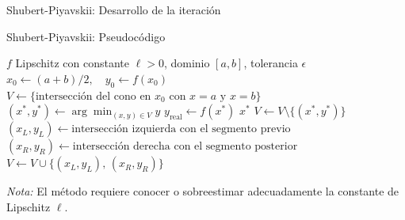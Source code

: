 \begin{frame}{Shubert-Piyavskii: Desarrollo de la iteración}
\begin{center}
\end{center}
\end{frame}

\begin{frame}{Shubert-Piyavskii: Pseudocódigo}
    \scriptsize
    \begin{algorithmic}[1]
        \Require \(f\) Lipschitz con constante \(\ell > 0\), dominio \([a,b]\), tolerancia \(\epsilon\)
        \State \(x_0 \gets (a+b)/2, \quad y_0 \gets f(x_0)\)
        \State \(V \gets \{\text{intersección del cono en } x_0 \text{ con } x=a \text{ y } x=b\}\) 
            \State \((x^*, y^*) \gets \arg\min_{(x,y) \in V} y\) 
            \State \(y_{\text{real}} \gets f(x^*)\)
             
                \State \Return \(x^*\)
            \EndIf
            \State \(V \gets V \setminus \{(x^*, y^*)\}\) 
            \State \((x_L, y_L) \gets \text{intersección izquierda con el segmento previo}\)
            \State \((x_R, y_R) \gets \text{intersección derecha con el segmento posterior}\)
            \State \(V \gets V \cup \{(x_L, y_L), \, (x_R, y_R)\}\)
        \EndWhile
    \end{algorithmic}
    \vspace{0.4em}
    {\tiny \textit{Nota:} El método requiere conocer o sobreestimar adecuadamente la constante de Lipschitz \(\ell\).}
\end{frame}

